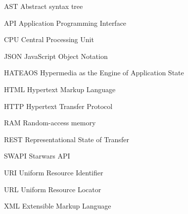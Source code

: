 \listoffigures
\cleardoublepage
\listoftables*
\cleardoublepage

\begin{siglas}
  \item[AST] Abstract syntax tree
  \item[API] Application Programming Interface
  \item[CPU] Central Processing Unit
  \item[JSON] JavaScript Object Notation
  \item[HATEAOS] Hypermedia as the Engine of Application State
  \item[HTML] Hypertext Markup Language
  \item[HTTP] Hypertext Transfer Protocol
  \item[RAM] Random-access memory
  \item[REST] Representational State of Transfer
  \item[SWAPI] Starwars API
  \item[URI] Uniform Resource Identifier
  \item[URL] Uniform Resource Locator
  \item[XML] Extensible Markup Language
\end{siglas}
\cleardoublepage

\tableofcontents*
\cleardoublepage
